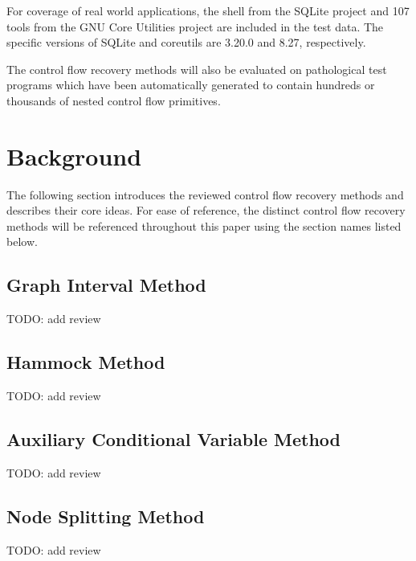 \documentclass[12pt, a4paper]{article}
\begin{document}
For coverage of real world applications, the shell from the SQLite project and 107 tools from the GNU Core Utilities project are included in the test data. The specific versions of SQLite and coreutils are 3.20.0 and 8.27, respectively.

The control flow recovery methods will also be evaluated on pathological test programs which have been automatically generated to contain hundreds or thousands of nested control flow primitives.


\clearpage


\section{Background}

The following section introduces the reviewed control flow recovery methods and describes their core ideas. For ease of reference, the distinct control flow recovery methods will be referenced throughout this paper using the section names listed below.

\subsection{Graph Interval Method}

TODO: add review \cite{structuring_decompiled_graphs}

\subsection{Hammock Method}

TODO: add review %

\subsection{Auxiliary Conditional Variable Method}

TODO: add review \cite{no_more_gotos}

\subsection{Node Splitting Method}

TODO: add review \cite{node_splitting}

\clearpage
\end{document}
